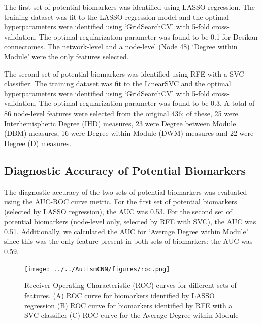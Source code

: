 \documentclass[11pt,conference]{IEEEtran}
\begin{document}
    The first set of potential biomarkers was identified using LASSO regression. The 
    training dataset was fit to the LASSO regression model and the optimal hyperparameters 
    were identified using `GridSearchCV' with 5-fold cross-validation. The optimal 
    regularization parameter was found to be 0.1 for Desikan connectomes. The network-level 
    and a node-level (Node 48) `Degree within Module' were the only features selected.

    The second set of potential biomarkers was identified using RFE with a SVC classifier. 
    The training dataset was fit to the LinearSVC and the optimal hyperparameters were 
    identified using `GridSearchCV' with 5-fold cross-validation. The optimal 
    regularization parameter was found to be 0.3. A total of 86 node-level features were 
    selected from the original 436; of these, 25 were Interhemispheric Degree (IHD) measures,
    23 were Degree between Module (DBM) measures, 16 were Degree within Module (DWM) 
    measures and 22 were Degree (D) measures.

\subsection*{\textbf{Diagnostic Accuracy of Potential Biomarkers}}

    The diagnostic accuracy of the two sets of potential biomarkers was evaluated using 
    the AUC-ROC curve metric. For the first set of potential biomarkers (selected by 
    LASSO regression), the AUC was 0.53. For the second set of potential biomarkers 
    (node-level only, selected by RFE with SVC), the AUC was 0.51. Additionally, we 
    calculated the AUC for `Average Degree within Module' since this was the only feature 
    present in both sets of biomarkers; the AUC was 0.59.

    \begin{figure}
        \vskip 0.2in
        \begin{center}
            \centerline{\texttt{[image: ../../AutismCNN/figures/roc.png]}}
            \caption{
                Receiver Operating Characteristic (ROC) curves for different sets of features.
                (A) ROC curve for biomarkers identified by LASSO regression
                (B) ROC curve for biomarkers identified by RFE with a SVC classifier
                (C) ROC curve for the Average Degree within Module
            }
            \label{clinical-corrmap}
        \end{center}
        \vskip -0.2in
    \end{figure}
\end{document}
